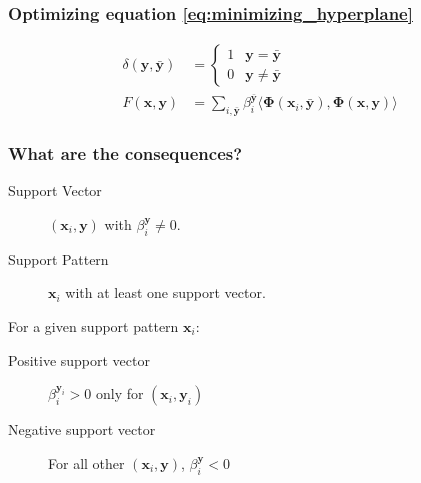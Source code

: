\begin{frame}
    \frametitle{Optimizing equation \eqref{eq:minimizing_hyperplane}}
    \[
        \begin{aligned}
            \delta(\mathbf{y}, \mathbf{\bar{y}}) &= \begin{cases}
                                                    1 & \mathbf{y} = \mathbf{\bar{y}} \\
                                                    0 & \mathbf{y} \ne \mathbf{\bar{y}}
                                               \end{cases} \nonumber \\
            F\left(\mathbf{x}, \mathbf{y}\right) & = \sum_{i, \mathbf{\bar{y}}} \beta_i^\mathbf{\bar{y}}
                \langle \mathbf{\Phi}\left(\mathbf{x}_i, \mathbf{\bar{y}}\right),
                \mathbf{\Phi}\left(\mathbf{x}, \mathbf{y}\right) \rangle
        \end{aligned}
    \]
\end{frame}

\begin{frame}
    \frametitle{What are the consequences?}
    \begin{description}
        \item [Support Vector] \(\left(\mathbf{x}_i, \mathbf{y}\right)\) with \(\beta_i^\mathbf{y} \ne 0\).
        \item [Support Pattern] \(\mathbf{x}_i\) with at least one support vector.
    \end{description}

    For a given support pattern \(\mathbf{x}_i\):
    \begin{description}
        \item [Positive support vector] \(\beta_i^{\mathbf{y}_i} > 0\) only for \(\left(\mathbf{x}_i, \mathbf{y}_i\right)\)
        \item [Negative support vector] For all other \(\left(\mathbf{x}_i, \mathbf{y}\right)\), \(\beta_i^\mathbf{y} < 0\)
    \end{description}
\end{frame}

